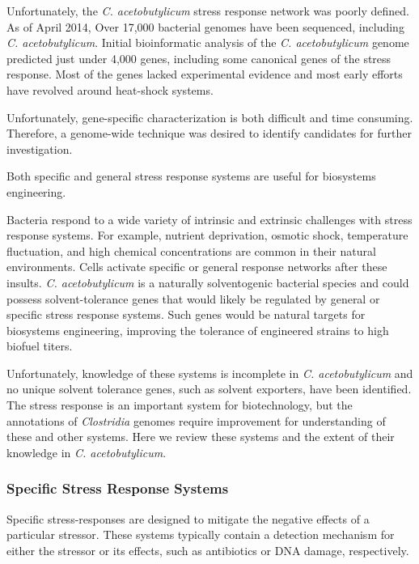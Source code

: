 Unfortunately, the \textit{C. acetobutylicum} stress response network was poorly defined. As of April 2014, Over 17,000 bacterial genomes have been sequenced\cite{89,90}, including \textit{C. acetobutylicum}\cite{91}. Initial bioinformatic analysis of the \textit{C. acetobutylicum} genome predicted just under 4,000 genes, including some canonical genes of the stress response\cite{91}. Most of the genes lacked experimental evidence and most early efforts have revolved around heat-shock systems.

Unfortunately, gene-specific characterization is both difficult and time consuming. Therefore, a genome-wide technique was desired to identify candidates for further investigation. 

Both specific and general stress response systems are useful for biosystems engineering.

Bacteria respond to a wide variety of intrinsic and extrinsic challenges with stress response systems. For example, nutrient deprivation, osmotic shock, temperature fluctuation, and high chemical concentrations are common in their natural environments. Cells activate specific or general response networks after these insults. \textit{C. acetobutylicum} is a naturally solventogenic bacterial species and could possess solvent-tolerance genes that would likely be regulated by general or specific stress response systems. Such genes would be natural targets for biosystems engineering, improving the tolerance of engineered strains to high biofuel titers. 

Unfortunately, knowledge of these systems is incomplete in \textit{C. acetobutylicum} and no unique solvent tolerance genes, such as solvent exporters, have been identified. The stress response is an important system for biotechnology, but the annotations of \textit{Clostridia} genomes require improvement for understanding of these and other systems. Here we review these systems and the extent of their knowledge in \textit{C. acetobutylicum}.


\subsubsection{Specific Stress Response Systems}
Specific stress-responses are designed to mitigate the negative effects of a particular stressor. These systems typically contain a detection mechanism for either the stressor or its effects, such as antibiotics or DNA damage, respectively.


